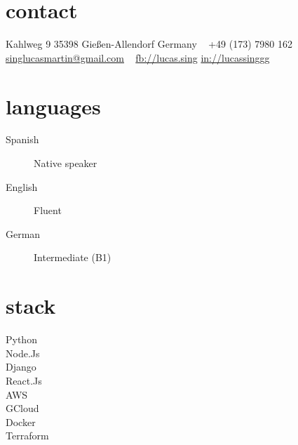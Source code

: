 \documentclass[a4paper,nocolors]{cv-friggeri-x}
\begin{document}


\begin{aside} %
\section{contact}
\pin \hfill Kahlweg 9
35398 Gießen-Allendorf
Germany
~
{\Large\textcolor{gray}{\Mobilefone}} \hfill +49 (173) 7980 162
\hfill \href{mailto:singlucasmartin@gmail.com}{\footnotesize singlucasmartin@gmail.com}
~
\flogo \hfill \href{http://facebook.com/lucas.sing}{fb://lucas.sing}
\llogo \hfill \href{https://www.linkedin.com/in/lucassinggg}{in://lucassinggg}
~
\section{languages}
\begin{description}
  \item[Spanish] \hfill Native speaker
  \item[English] \hfill Fluent
  \item[German] \hfill Intermediate (B1)
\end{description}
\section{stack}
\begin{description} 
  \item[Python] \hfill \filleddot \filleddot \filleddot \filleddot \emptydot
  \item[Node.Js] \hfill \filleddot \filleddot \filleddot \emptydot \emptydot
  \item[Django] \hfill \filleddot \filleddot \filleddot \filleddot \filleddot 
  \item[React.Js] \hfill \filleddot \filleddot \filleddot \emptydot \emptydot
  \item[AWS] \hfill \filleddot \filleddot \filleddot \emptydot \emptydot
  \item[GCloud] \hfill \filleddot \filleddot \filleddot \emptydot \emptydot
  \item[Docker] \hfill \filleddot \filleddot \filleddot \filleddot \emptydot
  \item[Terraform] \hfill \filleddot \emptydot \emptydot \emptydot \emptydot
\end{description}
\end{aside}
\end{document}
